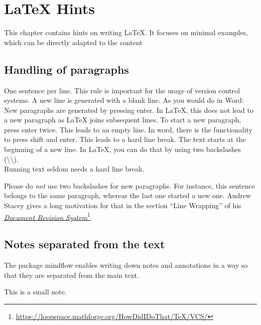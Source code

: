 \chapter{LaTeX Hints}
\label{sec:latexhints}

This chapter contains hints on writing LaTeX.
It focuses on minimal examples, which can be directly adapted to the content

\section{Handling of paragraphs}

\begin{ltgexample}
One sentence per line.
This rule is important for the usage of version control systems.
A new line is generated with a blank line.
As you would do in Word:
New paragraphs are generated by pressing enter.
In LaTeX, this does not lead to a new paragraph as LaTeX joins subsequent lines.
To start a new paragraph, press enter twice.
This leads to an empty line.
In word, there is the functionality to press shift and enter.
This leads to a hard line break.
The text starts at the beginning of a new line.
In LaTeX, you can do that by using two backslashes (\textbackslash\textbackslash).
\\
Running text seldom needs a hard line break.

Please do \textit{not} use two backslashes for new paragraphs.
For instance, this sentence belongs to the same paragraph, whereas the last one started a new one.
Andrew Stacey gives a long motivation for that in the section \enquote{Line Wrapping} of his \href{https://loopspace.mathforge.org/HowDidIDoThat/TeX/VCS/#section.3}{\emph{Document Revision System}}\footnote{\url{https://loopspace.mathforge.org/HowDidIDoThat/TeX/VCS/}}.
\end{ltgexample}

\section{Notes separated from the text}

The package mindflow enables writing down notes and annotations in a way so that they are separated from the main text.

\begin{ltgexample}
\begin{mindflow}
This is a small note.
\end{mindflow}
\end{ltgexample}

